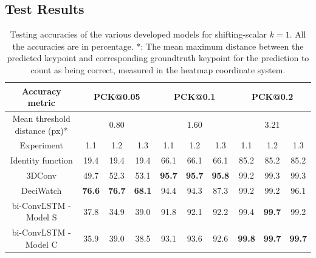 \documentclass[./main.tex]{subfiles}
\begin{document}
\subsection{Test Results}
\label{subsec:finetune_test_res}
\begin{table}[htbp]
    \begin{tabular}{c||ccc|ccc|ccc}
        \hline
        Accuracy metric & \multicolumn{3}{c}{PCK@0.05} & \multicolumn{3}{c}{PCK@0.1} & \multicolumn{3}{c}{PCK@0.2} \\
        \hline
        Mean threshold distance (px)* & \multicolumn{3}{c}{0.80} & \multicolumn{3}{c}{1.60} & \multicolumn{3}{c}{3.21} \\
        \hline
        Experiment & 1.1 & 1.2 & 1.3 & 1.1 & 1.2 & 1.3 & 1.1 & 1.2 & 1.3 \\
        \hline
        \hline
        Identity function & 19.4 & 19.4 & 19.4 & 66.1 & 66.1 & 66.1 & 85.2 & 85.2 & 85.2 \\
        3DConv & 49.7 & 52.3 & 53.1 & \textbf{95.7} & \textbf{95.7} & \textbf{95.8} & 99.2 & 99.3 & 99.3 \\
        DeciWatch & \textbf{76.6} & \textbf{76.7} & \textbf{68.1} & 94.4 & 94.3 & 87.3 & 99.2 & 99.2 & 96.1 \\
        bi-ConvLSTM - Model S & 37.8 & 34.9 & 39.0 & 91.8 & 92.1 & 92.2 & 99.4 & \textbf{99.7} & 99.2 \\
        bi-ConvLSTM - Model C & 35.9 & 39.0 & 38.5 & 93.1 & 93.6 & 92.6 & \textbf{99.8} & \textbf{99.7} & \textbf{99.7} \\
        \hline
    \end{tabular}
    \caption{Testing accuracies of the various developed models for shifting-scalar $k = 1$. All the accuracies are in percentage. *: The mean maximum distance between the predicted keypoint and corresponding groundtruth keypoint for the prediction to count as being correct, measured in the heatmap coordinate system.}
    \label{tab:finetune_test_accs_1}
\end{table}
\end{document}
